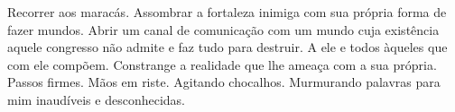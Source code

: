 Recorrer aos maracás. Assombrar a fortaleza inimiga com sua própria
forma de fazer mundos. Abrir um canal de comunicação com um mundo cuja
existência aquele congresso não admite e faz tudo para destruir. A ele e
todos àqueles que com ele compõem. Constrange a realidade que lhe ameaça
com a sua própria. Passos firmes. Mãos em riste. Agitando chocalhos.
Murmurando palavras para mim inaudíveis e desconhecidas.
